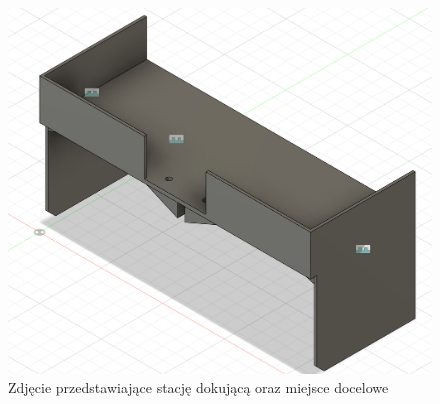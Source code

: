 \begin{figure}
    \centering
    \includegraphics[width=1.0\textwidth]{./graf/upper.png}
    \caption{Zdjęcie przedstawiające stację dokującą oraz miejsce docelowe}
    \label{fig:stacja}
\end{figure}